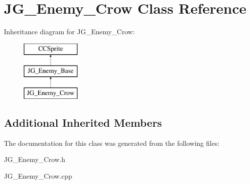 \hypertarget{class_j_g___enemy___crow}{\section{J\-G\-\_\-\-Enemy\-\_\-\-Crow Class Reference}
\label{class_j_g___enemy___crow}
}
Inheritance diagram for J\-G\-\_\-\-Enemy\-\_\-\-Crow\-:\begin{figure}[H]
\begin{center}
\leavevmode
\includegraphics[height=3.000000cm]{class_j_g___enemy___crow}
\end{center}
\end{figure}
\subsection*{Additional Inherited Members}


The documentation for this class was generated from the following files\-:\begin{DoxyCompactItemize}
\item 
J\-G\-\_\-\-Enemy\-\_\-\-Crow.\-h\item 
J\-G\-\_\-\-Enemy\-\_\-\-Crow.\-cpp\end{DoxyCompactItemize}

